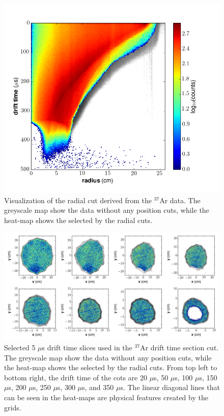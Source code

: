 \begin{figure}[h!]
\centering
  \includegraphics[width=\textwidth]{Figures/xycut_dt.png}
\caption{Visualization of the radial cut derived from the $^{37}$Ar data. The greyscale map show the data without any position cuts, while the heat-map shows the selected by the radial cuts. }
\label{fig:xycut_dt}
\end{figure}
\begin{figure}[h!]
\centering
  \includegraphics[width=\textwidth]{Figures/xycut_xy.png}
\caption{Selected 5 $\mu$s drift time slices used in the $^{37}$Ar drift time section cut. The greyscale map show the data without any position cuts, while the heat-map shows the selected by the radial cuts. From top left to bottom right, the drift time of the cots are 20 $\mu$s, 50 $\mu$s, 100 $\mu$s, 150 $\mu$s, 200 $\mu$s, 250 $\mu$s, 300 $\mu$s, and 350 $\mu$s. The linear diagonal lines that can be seen in the heat-maps are physical features created by the grids.}
\label{fig:xycut_xy}
\end{figure}

